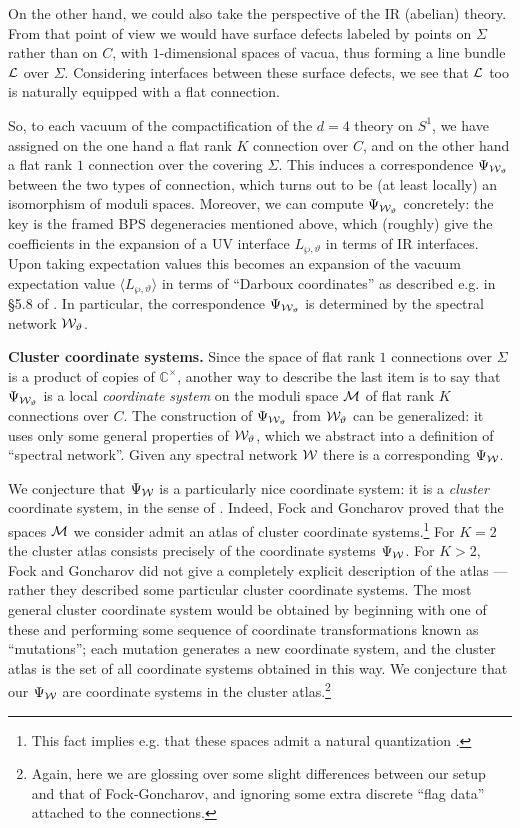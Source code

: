 \documentclass[11pt,a4paper]{article}
\def\IC{\mathbb{C}}
\def\CM {{\cal M}}
\def\CL {{\cal L}}
\def\wnet {{\cal W}}
\newcommand{\ti}[1]{\textit{#1}}
\def\IC{\mathbb{C}}
\def\CM {{\cal M}}
\def\CL {{\cal L}}
\def\wnet {{\cal W}}
\newcommand{\inprod}[1]{\langle#1\rangle}
\begin{document}
On the other hand, we could also take the perspective of the IR (abelian) theory.
From that point of view we would have surface defects
labeled by points on $\Sigma$ rather than on $C$, with $1$-dimensional spaces of vacua,
thus forming a line bundle $\CL$ over $\Sigma$.
Considering interfaces between these surface defects, we see that
$\CL$ too is naturally equipped with a flat connection.

So, to each vacuum of the compactification of the $d=4$ theory
on $S^1$, we have assigned on the one hand a flat rank $K$
connection over $C$, and on the other hand a flat rank $1$ connection over the covering $\Sigma$.
This induces a correspondence $\Psi_{\wnet_\vartheta}$
between the two types of connection, which turns out to be
(at least locally) an isomorphism of moduli spaces.  Moreover, we can compute
$\Psi_{\wnet_\vartheta}$ concretely:  the key is the framed BPS degeneracies mentioned above,
which (roughly) give the coefficients in the expansion of a UV interface $L_{\wp,\vartheta}$
in terms of IR interfaces.  Upon taking expectation values this becomes an expansion
of the vacuum expectation value $\inprod{L_{\wp,\vartheta}}$ in terms of ``Darboux coordinates''
as described e.g. in \S 5.8 of \cite{Gaiotto:2011tf}.
In particular, the correspondence $\Psi_{\wnet_\vartheta}$
is determined by the spectral network $\wnet_\vartheta$.

\smallskip
{\bf Cluster coordinate systems.}
Since the space of flat rank $1$ connections over $\Sigma$
is a product of copies of $\IC^\times$, another way to describe the last item
is to say that $\Psi_{\wnet_\vartheta}$ is a local \ti{coordinate system}
on the moduli space $\CM$ of flat rank $K$ connections over $C$.
The construction of $\Psi_{\wnet_\vartheta}$ from $\wnet_\vartheta$ can be
generalized:  it uses only some general properties of $\wnet_\vartheta$,
which we abstract into a definition of ``spectral network''.  Given any
spectral network $\wnet$ there is a corresponding $\Psi_\wnet$.

We conjecture that $\Psi_{\wnet}$ is a particularly nice coordinate system:
it is a \ti{cluster} coordinate system,
in the sense of \cite{MR2567745}.
Indeed, Fock and Goncharov proved \cite{MR2233852}
that the spaces $\CM$ we consider admit an atlas of cluster coordinate systems.\footnote{This
fact implies e.g. that these spaces admit a natural quantization \cite{MR2567745,qd-cluster}.}
For $K=2$ the cluster atlas
consists precisely of the coordinate systems $\Psi_\wnet$.
For $K>2$, Fock and Goncharov did not give a completely
explicit description of the atlas --- rather they described some particular cluster coordinate
systems.  The most general cluster coordinate system would be obtained by beginning with
one of these and performing some sequence of coordinate transformations
known as ``mutations''; each mutation generates a new coordinate system, and the
cluster atlas is the set of all coordinate systems obtained in this way.
We conjecture that our $\Psi_\wnet$ are coordinate systems in the
cluster atlas.\footnote{Again, here we are glossing over some slight differences between
our setup and that of Fock-Goncharov, and ignoring some extra discrete ``flag data'' attached to
the connections.}
\end{document}
